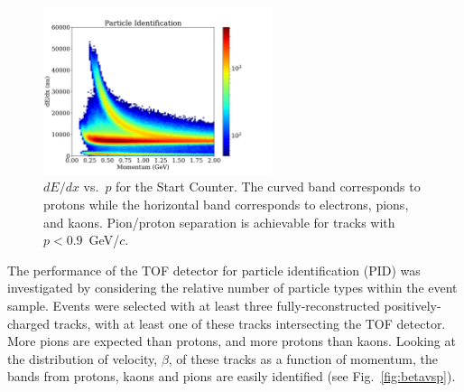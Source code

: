 \begin{figure}[!htb]
  \centering
  \includegraphics[width=0.6\textwidth]{figures/st_dedx_vs_p.pdf}
  \caption{$dE/dx$ vs.\ $p$ for the Start Counter.  The curved band
    corresponds to protons while the horizontal band corresponds to
    electrons, pions, and kaons. Pion/proton separation is achievable
    for tracks with $p < 0.9$~GeV/$c$.}\label{fig:ST_dEdx_vs_p}
\end{figure}

The performance of the TOF detector for particle identification (PID) was investigated by considering the relative number of
particle types within the event sample. Events were selected with at least three fully-reconstructed positively-charged tracks, with at least one of these tracks intersecting the TOF detector. More pions are expected than protons, and more protons than kaons. Looking at the distribution of velocity, $\beta$, of these tracks as a function of momentum, the bands from protons, kaons and pions are easily identified (see Fig.~\ref{fig:betavsp}). 

